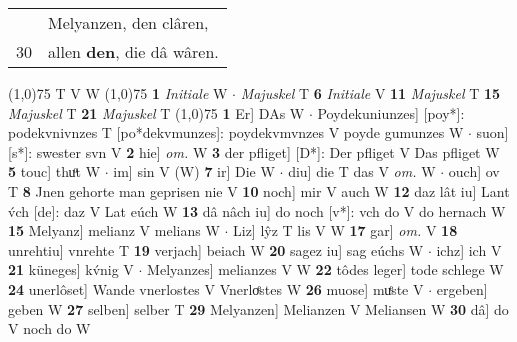 \documentclass[8pt,a4paper,notitlepage]{article}
\begin{document}
\begin{table}[ht]
\begin{minipage}[t]{0.5\linewidth}
\begin{tabular}{rl}
 & Melyanzen, den clâren,\\ 
30 & allen \textbf{den}, die dâ wâren.\\ 
\end{tabular}
\scriptsize
\line(1,0){75} \newline
T V W \newline
\line(1,0){75} \newline
\textbf{1} \textit{Initiale} W   $\cdot$ \textit{Majuskel} T  \textbf{6} \textit{Initiale} V  \textbf{11} \textit{Majuskel} T  \textbf{15} \textit{Majuskel} T  \textbf{21} \textit{Majuskel} T  \newline
\line(1,0){75} \newline
\textbf{1} Er] DAs W  $\cdot$ Poydekuniunzes] [poy*]: podekvnivnzes T [po*dekvmunzes]: poydekvmvnzes V poyde gumunzes W  $\cdot$ suon] [s*]: swester svn V \textbf{2} hie] \textit{om.} W \textbf{3} der pfliget] [D*]: Der pfliget V Das pfliget W \textbf{5} touc] thuͦt W  $\cdot$ im] sin V (W) \textbf{7} ir] Die W  $\cdot$ diu] die T das V \textit{om.} W  $\cdot$ ouch] ov T \textbf{8} Jnen gehorte man geprisen nie V \textbf{10} noch] mir V auch W \textbf{12} daz lât iu] Lant v́ch [de]: daz V Lat eúch W \textbf{13} dâ nâch iu] do noch [v*]: vch do V do hernach W \textbf{15} Melyanz] melianz V melians W  $\cdot$ Liz] lŷz T lis V W \textbf{17} gar] \textit{om.} V \textbf{18} unrehtiu] vnrehte T \textbf{19} verjach] beiach W \textbf{20} sagez iu] sag eúchs W  $\cdot$ ichz] ich V \textbf{21} küneges] kv́nig V  $\cdot$ Melyanzes] melianzes V W \textbf{22} tôdes leger] tode schlege W \textbf{24} unerlôset] Wande vnerlostes V Vnerloͤstes W \textbf{26} muose] muͤste V  $\cdot$ ergeben] geben W \textbf{27} selben] selber T \textbf{29} Melyanzen] Melianzen V Meliansen W \textbf{30} dâ] do V noch do W \newline
\end{minipage}
\end{table}
\end{document}
